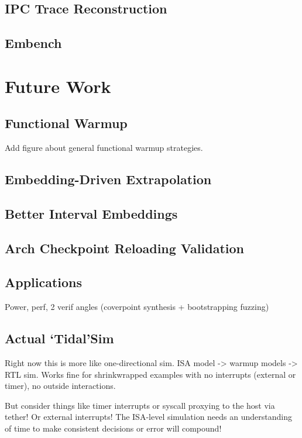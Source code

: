 \documentclass[sigplan,nonacm,10pt]{acmart}
\begin{document}
\subsection{IPC Trace Reconstruction}

\subsection{Embench}

\section{Future Work}

\subsection{Functional Warmup}

Add figure about general functional warmup strategies.

\subsection{Embedding-Driven Extrapolation}

\subsection{Better Interval Embeddings}

\subsection{Arch Checkpoint Reloading Validation}

\subsection{Applications}

Power, perf, 2 verif angles (coverpoint synthesis + bootstrapping fuzzing)

\subsection{Actual `Tidal'Sim}

Right now this is more like one-directional sim. ISA model -> warmup models -> RTL sim.
Works fine for shrinkwrapped examples with no interrupts (external or timer), no outside interactions.

But consider things like timer interrupts or syscall proxying to the host via tether! Or external interrupts!
The ISA-level simulation needs an understanding of time to make consistent decisions or error will compound!
\end{document}
